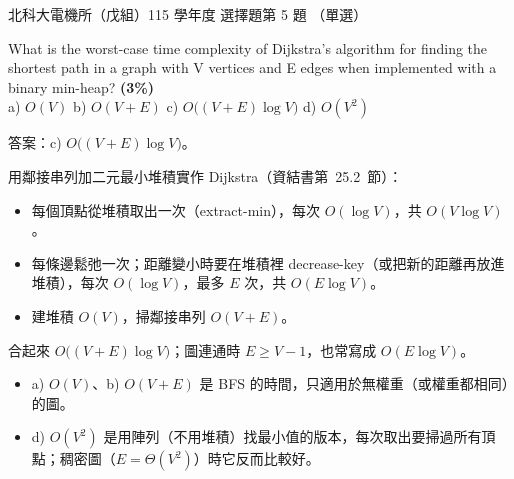 \begin{pastexam}[label={px:ntut-115-ee-ds-15}]{北科大電機所（戊組）115 學年度 選擇題第 5 題}
（單選）

What is the worst-case time complexity of Dijkstra's algorithm for finding the shortest path in a graph
with V vertices and E edges when implemented with a binary min-heap? \textbf{(3\%)}\\
a) $O(V)$ \qquad b) $O(V+E)$ \qquad c) $O\big((V+E)\log V\big)$ \qquad d) $O(V^2)$
\end{pastexam}

\begin{pastsoln}
答案：c) $O\bigl((V+E)\log V\bigr)$。

用鄰接串列加二元最小堆積實作 Dijkstra（資結書第~25.2~節）：
\begin{itemize}
\item 每個頂點從堆積取出一次（extract-min），每次 $O(\log V)$，共 $O(V \log V)$。
\item 每條邊鬆弛一次；距離變小時要在堆積裡 decrease-key（或把新的距離再放進堆積），每次 $O(\log V)$，最多
$E$ 次，共 $O(E \log V)$。
\item 建堆積 $O(V)$，掃鄰接串列 $O(V + E)$。
\end{itemize}
合起來 $O\bigl((V + E)\log V\bigr)$；圖連通時 $E \ge V - 1$，也常寫成 $O(E \log V)$。
\begin{itemize}
\item a) $O(V)$、b) $O(V + E)$ 是 BFS 的時間，只適用於無權重（或權重都相同）的圖。
\item d) $O(V^2)$ 是用陣列（不用堆積）找最小值的版本，每次取出要掃過所有頂點；稠密圖（$E = \Theta(V^2)$）時它反而比較好。
\end{itemize}
\end{pastsoln}
